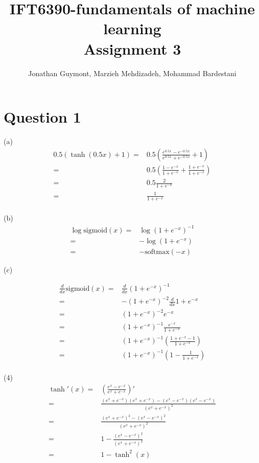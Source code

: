 \documentclass[11pt,english]{article}
\title{IFT6390-fundamentals of machine learning\\Assignment 3}
\author{Jonathan Guymont, Marzieh Mehdizadeh, Mohammad Bardestani}
\date{}
\newcommand{\sigmoid}{\mathrm{sigmoid}}
\newcommand{\softmax}{\mathrm{softmax}}
\begin{document}
\maketitle

\section*{Question 1}
(a) 
\begin{equation}
\begin{split}
0.5(\tanh(0.5x)+1) =& 0.5 (\frac{e^{0.5x}-e^{-0.5x}}{e^{0.5x}+e^{-0.5x}}+1)\\
=& 0.5 (\frac{1-e^{-x}}{1+e^{-x}}+\frac{1+e^{-x}}{1+e^{-x}})\\
=& 0.5\frac{2}{1+e^{-x}}\\
=& \frac{1}{1+e^{-x}}\\
\end{split}
\end{equation}

(b) 
\begin{equation}
\begin{split}
\log \sigmoid(x)=& \log (1+e^{-x})^{-1}\\
=& - \log (1+e^{-x})\\
=& -\softmax(-x)
\end{split}
\end{equation}

(c)

\begin{equation}
\begin{split}
\frac{d}{dx}\sigmoid(x) =& \frac{d}{dx} (1+e^{-x})^{-1}\\
=& -(1+e^{-x})^{-2}\frac{d}{dx} 1+e^{-x} \\
=& (1+e^{-x})^{-2}e^{-x}\\
=& (1+e^{-x})^{-1}\frac{e^{-x}}{1+e^{-x}}\\
=& (1+e^{-x})^{-1}(\frac{1+e^{-x}-1}{1+e^{-x}})\\
=& (1+e^{-x})^{-1}(1- \frac{1}{1+e^{-x}})\\
\end{split}
\end{equation}

(4) 
\begin{equation}
\begin{split}
\tanh'(x)=& (\frac{e^x-e^{-x}}{e^x+e^{-x}})'\\
=& \frac{(e^x+e^{-x})(e^x+e^{-x})-(e^x-e^{-x})(e^x-e^{-x})}{(e^x+e^{-x})^2}\\
=& \frac{(e^x+e^{-x})^2-(e^x-e^{-x})^2}{(e^x+e^{-x})^2}\\
=& 1- \frac{(e^x-e^{-x})^2}{(e^x+e^{-x})^2}\\
=& 1 - \tanh^2(x)
\end{split}
\end{equation}
\end{document}
